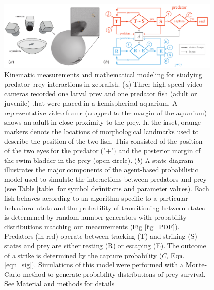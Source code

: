 \documentclass[]{rsos}%
\begin{document}
\pagebreak

\linespread{1}\selectfont %


\begin{figure}[!h]
\centering
	\includegraphics[width=5.5in]{fig_setup}
\caption{
Kinematic measurements and mathematical modeling for studying predator-prey interactions in zebrafish. 
(\textit{a}) Three high-speed video cameras recorded one larval prey and one predator fish (adult or juvenile) that were placed in a hemispherical aquarium. 
A representative video frame (cropped to the margin of the aquarium) shows an adult in close proximity to the prey. 
In the inset, orange markers denote the locations of morphological landmarks used to describe the position of the two fish.
This consisted of the position of the two eyes for the predator ("+") and the posterior margin of the swim bladder in the prey (open circle). 
 (\textit{b}) A state diagram illustrates the major components of the agent-based probabilistic model used to simulate the interactions between predators and prey (see Table \ref{table} for symbol definitions and parameter values). 
Each fish behaves according to an algorithm specific to a particular behavioral state and the probability of transitioning between states is determined by random-number generators with probability distributions matching our measurements (Fig \ref{fig_PDF}).
Predators (in red) operate between tracking (T) and striking (S) states and prey are either resting (R) or escaping (E).
The outcome of a strike is determined by the capture probability ($C$, Eqn. \ref{eqn_sig}). 
Simulations of this model were performed with a Monte-Carlo method to generate probability distributions of prey survival.
See Material and methods for details.
 }
\label{fig_setup}
\end{figure}

\pagebreak
\end{document}
